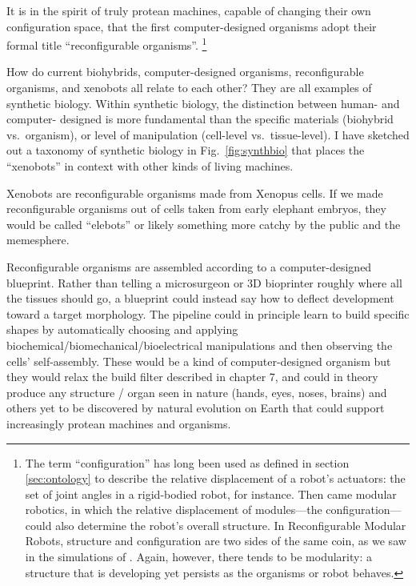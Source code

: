 It is in the spirit of truly protean machines, 
capable of changing their own configuration space,
that the first computer-designed organisms
adopt their formal title ``reconfigurable organisms''.%
\footnote{%
The term ``configuration'' has long been used as defined in section \ref{sec:ontology}
to describe the relative displacement of a robot's actuators: 
the set of joint angles in a rigid-bodied robot, for instance.
Then came modular robotics, in which the relative displacement of modules---the configuration---could also determine the robot's overall structure.
In Reconfigurable Modular Robots, structure and configuration are two sides of the same coin, as we saw in the simulations of \citet{pathak2019learning}.
Again, however, there tends to be modularity:
a structure
that is developing yet persists as the organisms or robot behaves.
}



How do current biohybrids,
computer-designed organisms,
reconfigurable organisms,
and xenobots
all relate to each other?
They are all examples of synthetic biology.
Within synthetic biology, the distinction between human- and computer- designed is more fundamental than the specific materials (biohybrid vs.~organism),
or level of manipulation (cell-level vs.~tissue-level).
I have sketched out a taxonomy of synthetic biology in  Fig.~\ref{fig:synthbio} that places the ``xenobots'' in context with other kinds of living machines.

Xenobots are reconfigurable organisms made from Xenopus cells.
If we made reconfigurable organisms out of cells taken from early elephant embryos, they would be called ``elebots'' or likely something more catchy by the public and the memesphere.

Reconfigurable organisms are assembled according to a computer-designed blueprint.
Rather than telling a microsurgeon or 3D bioprinter roughly where all the tissues should go, 
a blueprint could instead say how to deflect development toward a target morphology.
The pipeline could in principle learn to build specific shapes by automatically choosing and applying biochemical/biomechanical/bioelectrical
manipulations and then observing the cells' self-assembly.
These would be a kind of computer-designed organism but they would relax the build filter described in chapter 7, and could in theory produce any structure / organ seen in nature (hands, eyes, noses, brains) and others yet to be discovered by natural evolution on Earth that could support increasingly protean machines and organisms.


